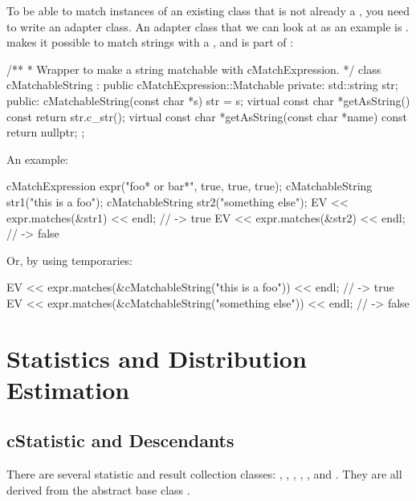 To be able to match instances of an existing class that is not already a
, you need to write an adapter class. An adapter class that
we can look at as an example is . 
makes it possible to match strings with a , and is part
of {\opp}:

\begin{cpp}
/**
 * Wrapper to make a string matchable with cMatchExpression.
 */
class cMatchableString : public cMatchExpression::Matchable
{
  private:
    std::string str;
  public:
    cMatchableString(const char *s) {str = s;}
    virtual const char *getAsString() const {return str.c_str();}
    virtual const char *getAsString(const char *name) const {return nullptr;}
};
\end{cpp}

An example:

\begin{cpp}
cMatchExpression expr("foo* or bar*", true, true, true);
cMatchableString str1("this is a foo");
cMatchableString str2("something else");
EV << expr.matches(&str1) << endl; // -> true
EV << expr.matches(&str2) << endl; // -> false
\end{cpp}

Or, by using temporaries:

\begin{cpp}
EV << expr.matches(&cMatchableString("this is a foo")) << endl; // -> true
EV << expr.matches(&cMatchableString("something else")) << endl; // -> false
\end{cpp}



\section{Statistics and Distribution Estimation}
\label{sec:ch-sim-lib:statistics}

\subsection{cStatistic and Descendants}

There are several statistic and result collection classes:
, , ,
, ,  and
. They are all derived from the abstract base class
.

